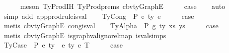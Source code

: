 \begin{isabellebody}
\ \ \ \ \isamarkupfalse%
\ {\isacharparenleft}{\kern0pt}meson\ TyProd{\isachardot}{\kern0pt}IH\ TyProd{\isachardot}{\kern0pt}prems\ cbv{\isacharunderscore}{\kern0pt}ty{\isacharunderscore}{\kern0pt}GraphE{\isacharparenright}{\kern0pt}\isanewline
\ \ \isamarkupfalse%
\ \isamarkupfalse%
\ {\isacharquery}{\kern0pt}case\isanewline
\ \ \isamarkupfalse%
\ auto\isanewline
\ \ \isamarkupfalse%
\ {\isacharparenleft}{\kern0pt}simp\ add{\isacharcolon}{\kern0pt}\ app{\isacharunderscore}{\kern0pt}prodrule{\isacharunderscore}{\kern0pt}is{\isacharunderscore}{\kern0pt}val{\isacharparenright}{\kern0pt}\isanewline
{}\isamarkupfalse%
\isanewline
\ \ \isamarkupfalse%
\ {\isacharparenleft}{\kern0pt}TyCong\ {\isasymGamma}\ P\ e{}\ ty\ e{}{\isacharparenright}{\kern0pt}\isanewline
\ \ \isamarkupfalse%
\ \isamarkupfalse%
\ {\isacharquery}{\kern0pt}case\isanewline
\ \ \isamarkupfalse%
\ {\isacharparenleft}{\kern0pt}metis\ cbv{\isacharunderscore}{\kern0pt}ty{\isacharunderscore}{\kern0pt}GraphE\ cong{\isacharunderscore}{\kern0pt}is{\isacharunderscore}{\kern0pt}val{\isacharparenright}{\kern0pt}\isanewline
{}\isamarkupfalse%
\isanewline
\ \ \isamarkupfalse%
\ {\isacharparenleft}{\kern0pt}TyAlpha\ {\isasymGamma}{}\ P\ g\ ty\ xs\ ys{\isacharparenright}{\kern0pt}\isanewline
\ \ \isamarkupfalse%
\ \isamarkupfalse%
\ {\isacharquery}{\kern0pt}case\isanewline
\ \ \isamarkupfalse%
\ {\isacharparenleft}{\kern0pt}metis\ cbv{\isacharunderscore}{\kern0pt}ty{\isacharunderscore}{\kern0pt}GraphE\ is{\isacharunderscore}{\kern0pt}graph{\isacharunderscore}{\kern0pt}val{\isacharunderscore}{\kern0pt}ignore{\isacharunderscore}{\kern0pt}lmap\ is{\isacharunderscore}{\kern0pt}val{\isachardot}{\kern0pt}simps{\isacharparenleft}{\kern0pt}{}{\isacharparenright}{\kern0pt}{\isacharparenright}{\kern0pt}\isanewline
{}\isamarkupfalse%
\isanewline
\ \ \isamarkupfalse%
\ {\isacharparenleft}{\kern0pt}TyCase\ {\isasymGamma}\ P\ e{}\ ty{}\ {\isasymGamma}{}\ e{}\ ty{}\ e{}\ T{\isacharparenright}{\kern0pt}\isanewline
\ \ \isamarkupfalse%
\ \isamarkupfalse%
\ {\isacharquery}{\kern0pt}case\isanewline
\ \ \isamarkupfalse%

\end{isabellebody}
